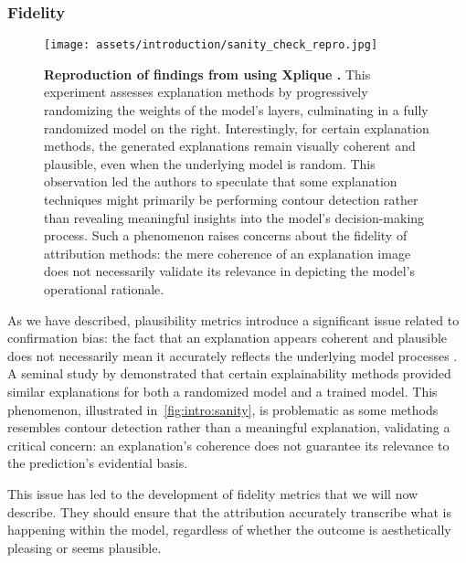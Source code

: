 \subsubsection{Fidelity}

\begin{figure}[ht]
    \centering
    \texttt{[image: assets/introduction/sanity\_check\_repro.jpg]}
    \caption{\textbf{Reproduction of findings from \cite{adebayo2018sanity} using Xplique \cite{fel2022xplique}.} This experiment assesses explanation methods by progressively randomizing the weights of the model's layers, culminating in a fully randomized model on the right. Interestingly, for certain explanation methods, the generated explanations remain visually coherent and plausible, even when the underlying model is random. This observation led the authors to speculate that some explanation techniques might primarily be performing contour detection rather than revealing meaningful insights into the model's decision-making process. Such a phenomenon raises concerns about the fidelity of attribution methods: the mere coherence of an explanation image does not necessarily validate its relevance in depicting the model's operational rationale.}
    \label{fig:intro:sanity}
\end{figure}

As we have described, plausibility metrics introduce a significant issue related to confirmation bias: the fact that an explanation appears coherent and plausible does not necessarily mean it accurately reflects the underlying model processes \cite{adebayo2018sanity}. A seminal study by \cite{adebayo2018sanity} demonstrated that certain explainability methods provided similar explanations for both a randomized model and a trained model. This phenomenon, illustrated in~\autoref{fig:intro:sanity}, is problematic as some methods resembles contour detection rather than a meaningful explanation, validating a critical concern: an explanation's coherence does not guarantee its relevance to the prediction's evidential basis.

This issue has led to the development of fidelity metrics that we will now describe. They should ensure that the attribution accurately transcribe what is happening within the model, regardless of whether the outcome is aesthetically pleasing or seems plausible. 

